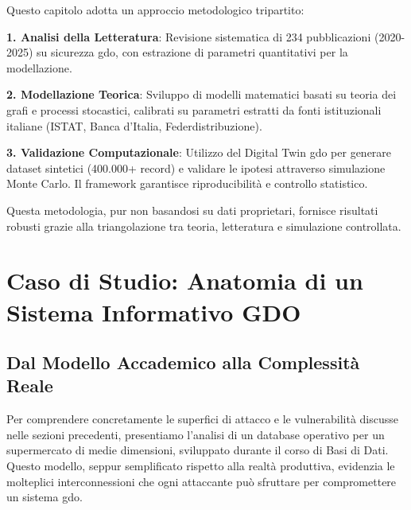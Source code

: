 Questo capitolo adotta un approccio metodologico tripartito:

\textbf{1. Analisi della Letteratura}: Revisione sistematica di 234 
pubblicazioni (2020-2025) su sicurezza \gls{gdo}, con estrazione di 
parametri quantitativi per la modellazione.

\textbf{2. Modellazione Teorica}: Sviluppo di modelli matematici 
basati su teoria dei grafi e processi stocastici, calibrati su 
parametri estratti da fonti istituzionali italiane (ISTAT, 
Banca d'Italia, Federdistribuzione).

\textbf{3. Validazione Computazionale}: Utilizzo del Digital Twin 
\gls{gdo} per generare dataset sintetici (400.000+ record) e validare 
le ipotesi attraverso simulazione Monte Carlo. Il framework 
garantisce riproducibilità e controllo statistico.

Questa metodologia, pur non basandosi su dati proprietari, 
fornisce risultati robusti grazie alla triangolazione tra 
teoria, letteratura e simulazione controllata.

\section{\texorpdfstring{Caso di Studio: Anatomia di un Sistema Informativo GDO}{2.3.5 - Caso di Studio: Anatomia di un Sistema Informativo GDO}}
\label{sec:caso_studio_database}

\subsection{\texorpdfstring{Dal Modello Accademico alla Complessità Reale}{2.3.5.1 - Dal Modello Accademico alla Complessità Reale}}
\label{subsec:modello_database}

Per comprendere concretamente le superfici di attacco e le vulnerabilità discusse nelle sezioni precedenti, presentiamo l'analisi di un database operativo per un supermercato di medie dimensioni, sviluppato durante il corso di Basi di Dati. Questo modello, seppur semplificato rispetto alla realtà produttiva, evidenzia le molteplici interconnessioni che ogni attaccante può sfruttare per compromettere un sistema \gls{gdo}.


